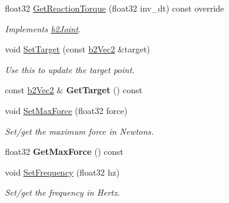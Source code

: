 \begin{DoxyCompactItemize}
\mbox{\label{classb2MouseJoint_aa9ea0d1b1aa2db5be3ed63392a7e28a2}} 
float32 \hyperlink{classb2MouseJoint_aa9ea0d1b1aa2db5be3ed63392a7e28a2}{Get\+Reaction\+Torque} (float32 inv\+\_\+dt) const override
\begin{DoxyCompactList}\small\item\em Implements \hyperlink{classb2Joint}{b2\+Joint}. \end{DoxyCompactList}\item 
\mbox{\label{classb2MouseJoint_a96f34c1c990407eddbadf07ae359b1f3}} 
void \hyperlink{classb2MouseJoint_a96f34c1c990407eddbadf07ae359b1f3}{Set\+Target} (const \hyperlink{structb2Vec2}{b2\+Vec2} \&target)
\begin{DoxyCompactList}\small\item\em Use this to update the target point. \end{DoxyCompactList}\item 
\mbox{\label{classb2MouseJoint_a519a578a2683d8f016612329a00a9db5}} 
const \hyperlink{structb2Vec2}{b2\+Vec2} \& {\bfseries Get\+Target} () const
\item 
\mbox{\label{classb2MouseJoint_a4beba6ea0827960fac2474563591c03a}} 
void \hyperlink{classb2MouseJoint_a4beba6ea0827960fac2474563591c03a}{Set\+Max\+Force} (float32 force)
\begin{DoxyCompactList}\small\item\em Set/get the maximum force in Newtons. \end{DoxyCompactList}\item 
\mbox{\label{classb2MouseJoint_a61c9fbd78498d3484f824876654eb015}} 
float32 {\bfseries Get\+Max\+Force} () const
\item 
\mbox{\label{classb2MouseJoint_a8b37706535923637ca280c5a0467b14d}} 
void \hyperlink{classb2MouseJoint_a8b37706535923637ca280c5a0467b14d}{Set\+Frequency} (float32 hz)
\begin{DoxyCompactList}\small\item\em Set/get the frequency in Hertz. \end{DoxyCompactList}\item 
\mbox{\label{classb2MouseJoint_a97b9264cc357ac96e447990f52086719}} 

\end{DoxyCompactItemize}
